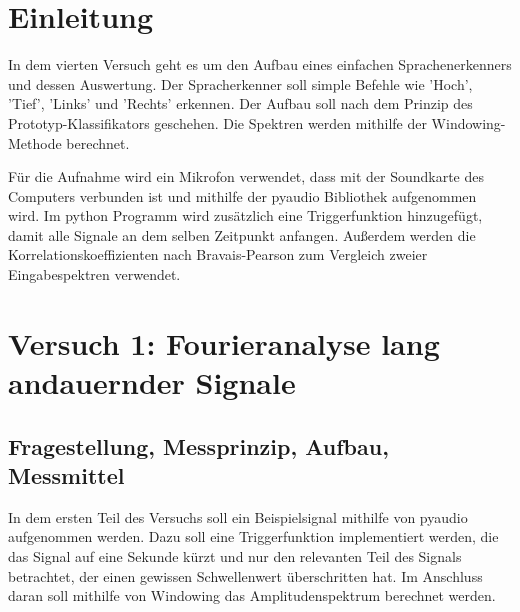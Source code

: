 \documentclass[12pt, oneside, a4paper, \docLanguage]{report}
\begin{document}

\setcounter{section}{0}



\clearpage

%
%


%
%


%
%


%
%




\setcounter{page}{1}
\pagestyle{default}
%
%
\chapter{Einleitung}
\label{chap:EINL}
In dem vierten Versuch geht es um den Aufbau eines einfachen Sprachenerkenners und dessen Auswertung. Der Spracherkenner soll simple Befehle wie 'Hoch', 'Tief', 'Links' und 'Rechts' erkennen. Der Aufbau soll nach dem Prinzip des Prototyp-Klassifikators geschehen.
Die Spektren werden mithilfe der Windowing-Methode berechnet.

Für die Aufnahme wird ein Mikrofon verwendet, dass mit der Soundkarte des Computers verbunden ist und mithilfe der pyaudio Bibliothek aufgenommen wird. Im python Programm wird zusätzlich eine Triggerfunktion hinzugefügt, damit alle Signale an dem selben Zeitpunkt anfangen.
Außerdem werden die Korrelationskoeffizienten nach Bravais-Pearson zum Vergleich zweier Eingabespektren verwendet.

%
%
\chapter{Versuch 1: Fourieranalyse lang andauernder Signale}
\label{chap:VERSUCH_1}

\section{Fragestellung, Messprinzip, Aufbau, Messmittel}
\label{chap:VERSUCH_1_FRAGESTELLUNG}
In dem ersten Teil des Versuchs soll ein Beispielsignal mithilfe von pyaudio aufgenommen werden. Dazu soll eine Triggerfunktion implementiert werden, die das Signal auf eine Sekunde kürzt und nur den relevanten Teil des Signals betrachtet, der einen gewissen Schwellenwert überschritten hat. Im Anschluss daran soll mithilfe von Windowing das Amplitudenspektrum berechnet werden.
\end{document}
